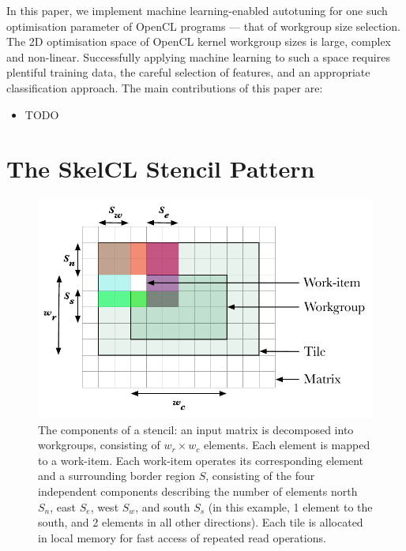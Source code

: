 \documentclass[preprint,nonatbib,10pt]{sigplanconf}
\begin{document}
In this paper, we implement machine learning-enabled autotuning for
one such optimisation parameter of OpenCL programs --- that of
workgroup size selection. The 2D optimisation space of OpenCL kernel
workgroup sizes is large, complex and non-linear. Successfully
applying machine learning to such a space requires plentiful training
data, the careful selection of features, and an appropriate
classification approach. The main contributions of this paper are:
%
\begin{itemize}
\item TODO
\end{itemize}

\section{The SkelCL Stencil Pattern}

\begin{figure}
\centering
\includegraphics[width=.75\columnwidth]{img/stencil}
\caption[Stencil border region]{%
  The components of a stencil: an input matrix is decomposed into
  workgroups, consisting of $w_r \times w_c$ elements. Each element is
  mapped to a work-item. Each work-item operates its corresponding
  element and a surrounding border region $S$, consisting of the four
  independent components describing the number of elements north
  $S_n$, east $S_e$, west $S_w$, and south $S_s$ (in this example, 1
  element to the south, and 2 elements in all other directions). Each
  tile is allocated in local memory for fast access of repeated read
  operations.%
}
\label{fig:stencil-shape}
\end{figure}
\end{document}
